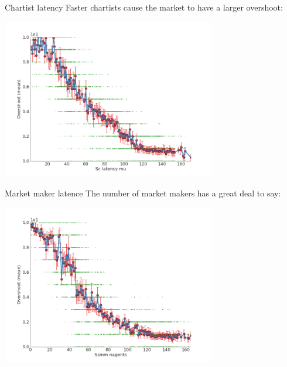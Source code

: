 \documentclass[14pt]{beamer}
\begin{document}
\begin{frame}{Chartist latency}
Faster chartists cause the market to have a larger overshoot:
\begin{center}
\includegraphics[width=0.7\textwidth]{scatter/sc_latency_mu__vs__overshoot(mean)_scatter.png}
\end{center}
\end{frame}

\begin{frame}{Market maker latence}
The number of market makers has a great deal to say:
\begin{center}
\includegraphics[width=0.7\textwidth]{scatter/ssmm_nAgents__vs__overshoot(mean)_scatter.png}
\end{center}
\end{frame}

\end{document}
